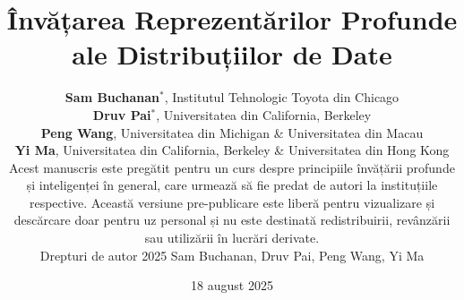 \documentclass{book}
\begin{document}
\title{Învățarea Reprezentărilor Profunde\\ ale Distribuțiilor de Date}

\author{\vspace{0.5cm}
\textbf{Sam Buchanan}$^*$, Institutul Tehnologic Toyota din Chicago \vspace{3mm}\\
    \textbf{Druv Pai}$^*$, Universitatea din California, Berkeley \vspace{3mm} \\
    \textbf{Peng Wang}, Universitatea din Michigan \&
    Universitatea din Macau  \vspace{3mm} \\
    \textbf{Yi Ma},   Universitatea din California, Berkeley \& Universitatea din Hong Kong
	\vspace{8cm}\\
	\footnotesize
	Acest manuscris este pregătit pentru un curs despre principiile învățării profunde
  și inteligenței în general, care urmează să fie predat de autori la instituțiile
  respective. Această versiune pre-publicare este liberă pentru vizualizare și descărcare doar
  pentru uz personal și nu este destinată redistribuirii, revânzării sau utilizării în lucrări
  derivate.\\ Drepturi de autor  2025 Sam Buchanan, Druv Pai, Peng Wang, Yi
  Ma
}

\date{\large 18 august 2025}

\frontmatter
\titlepage
\thispagestyle{empty}
\maketitle

\cleardoublepage

% 

% 

% 
\end{document}

